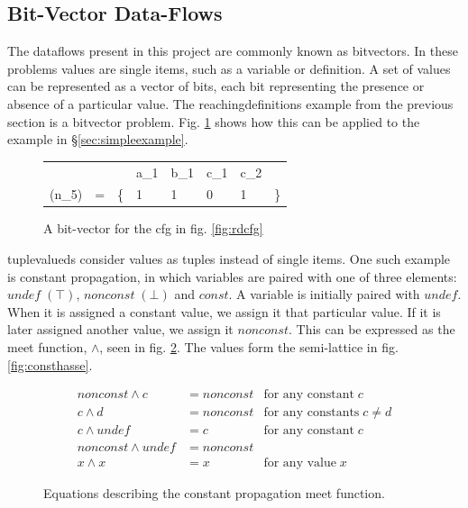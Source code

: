 \documentclass[bsc,twoside,singlespacing,parskip,logo,notimes,normalheadings]{infthesis}
\begin{document}
        \subsection{Bit-Vector Data-Flows}
        
        The \gls{dataflow}s present in this project are commonly known
        as \gls{bitvector}s. In these problems values are single
        items, such as a variable or definition. A set of values can
        be represented as a vector of bits, each bit representing the
        presence or absence of a particular value. The
        \gls{reachingdefinition}s example from the previous section is
        a \gls{bitvector} problem. Fig. \ref{fig:bitvector} shows how
        this can be applied to the example in
        \S\ref{sec:simpleexample}.

        \begin{figure}[!ht]
          \centering
          \begin{tabular}{M{r} M{c} T{r} T{c} T{c} T{c} T{c} T{l}}
                            &   &    & a_1 & b_1 & c_1 & c_2 &    \\
            (n_5) & = & \{ & 1   & 1   & 0   & 1   & \} \\
          \end{tabular}
          \caption{A bit-vector for the \gls{cfg} in fig. \ref{fig:rdcfg}}\label{fig:bitvector}
        \end{figure}

        \Gls{tuplevalued}s consider values as tuples instead of single
        items. One such example is constant propagation, in which
        variables are paired with one of three elements:
        $undef\;(\top)$, $nonconst\;(\bot)$ and $const$. A variable is
        initially paired with $undef$. When it is assigned a constant
        value, we assign it that particular value. If it is later
        assigned another value, we assign it $nonconst$. This can be
        expressed as the meet function, $\land$, seen in
        fig. \ref{fig:constmeet}. The values form the semi-lattice in
        fig. \ref{fig:consthasse}.

        \begin{figure}[h]
        \begin{align*}
        nonconst \land c     & = nonconst & \text{for any constant} \; c         \\
        c \land d            & = nonconst & \text{for any constants} \; c \neq d \\
        c \land undef        & = c        & \text{for any constant} \; c         \\
        nonconst \land undef & = nonconst &                                      \\
        x \land x            & = x        & \text{for any value} \; x
        \end{align*}
        \caption{Equations describing the constant propagation meet function.}
        \label{fig:constmeet}
        \end{figure}
        
\end{document}
